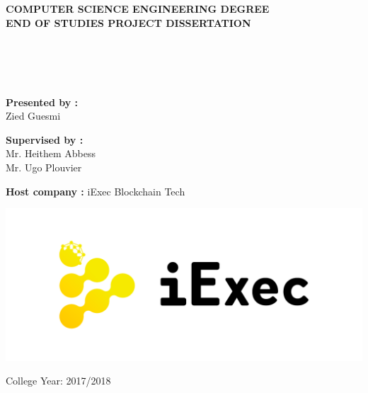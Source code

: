 \documentclass[a4paper,12pt,times,numbered,print,index]{report}
\begin{document}
\begin{center}
    \bf \large {COMPUTER SCIENCE ENGINEERING DEGREE} \\
    \bf \large {END OF STUDIES PROJECT DISSERTATION} \\
\end{center}
~~
\\
~~
\\
\\
\\
{ \hspace*{2 cm} \bf Presented by :} \\  
{\hspace*{6 cm}    Zied Guesmi \\}

{\hspace*{1.18 cm} \bf Supervised by :}  \\    
{ \hspace*{6 cm}  Mr. Heithem Abbess \\}
{ \hspace*{6 cm}  Mr. Ugo Plouvier \\}

{\hspace*{1.1 cm} \bf Host company :} 
{ \hspace*{0.5 cm}  iExec Blockchain Tech \\}

\begin{center}
    \includegraphics[scale=0.25]{figs/iExec.pdf}
\end{center}

\begin{center}
    College Year: 2017/2018
\end{center}
\end{document}
